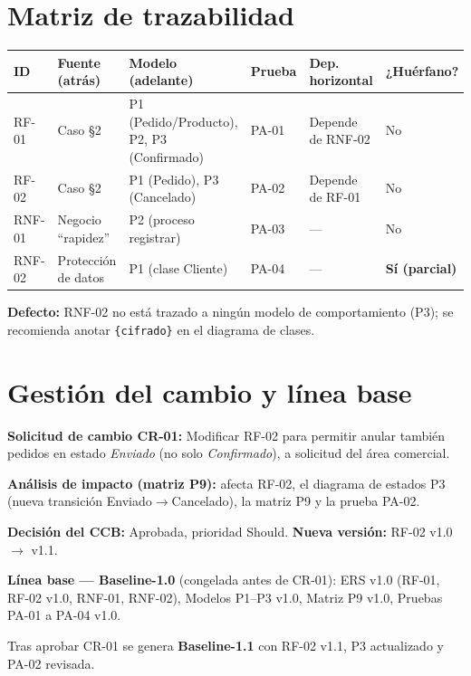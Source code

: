 \documentclass[11pt]{article}
\begin{document}
\section{Matriz de trazabilidad}

\begin{center}
\scriptsize
\begin{tabular}{p{1cm}p{2.2cm}p{3.1cm}p{1.1cm}p{2.6cm}p{1.6cm}}
\toprule
\textbf{ID} & \textbf{Fuente (atrás)} & \textbf{Modelo (adelante)} & \textbf{Prueba} & \textbf{Dep. horizontal} & \textbf{¿Huérfano?} \\
\midrule
RF-01 & Caso §2 & P1 (Pedido/Producto), P2, P3 (Confirmado) & PA-01 & Depende de RNF-02 & No \\
RF-02 & Caso §2 & P1 (Pedido), P3 (Cancelado) & PA-02 & Depende de RF-01 & No \\
RNF-01 & Negocio ``rapidez'' & P2 (proceso registrar) & PA-03 & --- & No \\
RNF-02 & Protección de datos & P1 (clase Cliente) & PA-04 & --- & \textbf{Sí (parcial)} \\
\bottomrule
\end{tabular}
\end{center}
\textbf{Defecto:} RNF-02 no está trazado a ningún modelo de comportamiento (P3); se recomienda anotar \texttt{\{cifrado\}} en el diagrama de clases.

\section{Gestión del cambio y línea base}

\textbf{Solicitud de cambio CR-01:} Modificar RF-02 para permitir anular también pedidos en estado \emph{Enviado} (no solo \emph{Confirmado}), a solicitud del área comercial.

\textbf{Análisis de impacto (matriz P9):} afecta RF-02, el diagrama de estados P3 (nueva transición Enviado$\to$Cancelado), la matriz P9 y la prueba PA-02.

\textbf{Decisión del CCB:} Aprobada, prioridad Should. \quad \textbf{Nueva versión:} RF-02 v1.0 $\to$ v1.1.

\textbf{Línea base --- Baseline-1.0} (congelada antes de CR-01): ERS v1.0 (RF-01, RF-02 v1.0, RNF-01, RNF-02), Modelos P1--P3 v1.0, Matriz P9 v1.0, Pruebas PA-01 a PA-04 v1.0.

Tras aprobar CR-01 se genera \textbf{Baseline-1.1} con RF-02 v1.1, P3 actualizado y PA-02 revisada.
\end{document}
